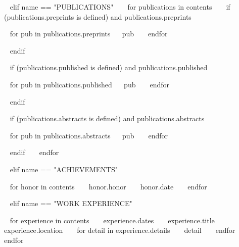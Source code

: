 \begin{minipage}{\textwidth}
~{ elif name == "PUBLICATIONS" }~
~{ for publications in contents }~
  ~{ if (publications.preprints is defined) and publications.preprints }~
  \begin{entrylist}[.1]
    ~{ for pub in publications.preprints}~
    \pubentry
      {~{{ pub }}~}
    ~{ endfor }~
  \end{entrylist}
  ~{ endif }~

  ~{ if (publications.published is defined) and publications.published }~
  \begin{entrylist}[.1]
    ~{ for pub in publications.published}~
    \pubentry
      {~{{ pub }}~}
    ~{ endfor }~
  \end{entrylist}
  ~{ endif }~

  ~{ if (publications.abstracts is defined) and publications.abstracts }~
  \begin{entrylist}[.1]
    ~{ for pub in publications.abstracts}~
    \pubentry
      {~{{ pub }}~}
    ~{ endfor }~
  \end{entrylist}
  ~{ endif }~
~{ endfor }~


~{ elif name == "ACHIEVEMENTS" }~
\begin{entrylist}[.1]
  ~{ for honor in contents }~
  \awardentry
    {~{{ honor.honor }}~}
    {~{{ honor.date }}~}
  ~{ endfor }~
\end{entrylist}



~{ elif name == "WORK EXPERIENCE" }~
\begin{entrylist}
~{ for experience in contents }~
  \entry
    {~{{ experience.dates }}~}
    {~{{ experience.title }}~}
    {~{{ experience.location }}~}
    {~{ for detail in experience.details }~ ~{{ detail }}~ ~{ endfor }~}
~{ endfor }~
\end{entrylist}
  



\end{minipage}
